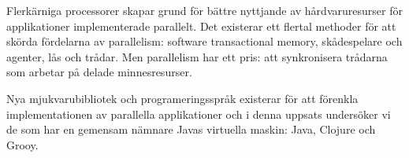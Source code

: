 Flerkärniga processorer skapar grund för bättre nyttjande av hårdvaruresurser för applikationer implementerade parallelt. Det existerar ett flertal methoder för att skörda fördelarna av parallelism: software transactional memory, skådespelare och agenter, lås och trådar. Men parallelism har ett pris: att synkronisera trådarna som arbetar på delade minnesresurser.

Nya mjukvarubibliotek och programeringsspråk existerar för att förenkla implementationen av parallella applikationer och i denna uppsats undersöker vi de som har en gemensam nämnare Javas virtuella maskin: Java, Clojure och Grooy. 
\endinput